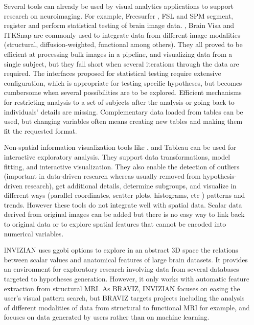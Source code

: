 \documentclass[twocolumn]{svjour3}
\begin{document}
Several tools can already be used by visual analytics applications to support research on neuroimaging. For example, Freesurfer \cite{fischl_freesurfer_2012}, FSL \cite{jenkinson_fsl_2012} and SPM \cite{friston_statistical_2006} segment, register and perform statistical testing of brain image data. \cite{fedorov_3d_2012}, Brain Visa \cite{cointepas_brainvisa:_2001} and ITKSnap \cite{yushkevich_user-guided_2006} are commonly used to integrate data from different image modalities (structural, diffusion-weighted, functional among others). They all proved to be efficient at processing bulk images in a pipeline, and visualizing data from a single subject, but they fall short when several iterations through the data are required. The interfaces proposed for statistical testing require extensive configuration, which is appropriate for testing specific hypotheses, but becomes cumbersome when several possibilities are to be explored. Efficient mechanisms for restricting analysis to a set of subjects after the analysis or going back to individuals’ details are missing. Complementary data loaded from tables can be used, but changing variables often means creating new tables and making them fit the requested format.


Non-spatial information visualization tools like \cite{cook_interactive_2007}, and Tableau\cite{hanrahan_tableau_2003} can be used for interactive exploratory analysis. They support data transformations, model fitting, and interactive visualization. They also enable the detection of outliers (important in data-driven research whereas usually removed from hypothesis-driven research), get additional details, determine subgroups, and visualize in different ways (parallel coordinates, scatter plots, histograms, etc ) patterns and trends. However these tools do not integrate well with spatial data. Scalar data derived from original images can be added but there is no easy way to link back to original data or to explore spatial features that cannot be encoded into numerical variables.


INVIZIAN \cite{bowman_query-based_2011}\cite{bowman_feature-similarity_2012}\cite{bowman_visual_2012} uses ggobi options to explore in an abstract 3D space the relations between scalar values and anatomical features of large brain datasets. It provides an environment for exploratory research involving data from several databases targeted to hypotheses generation. However, it only works with automatic feature extraction from structural MRI. As BRAVIZ, INVIZIAN focuses on easing the user’s visual pattern search, but BRAVIZ targets projects including the analysis of different modalities of data from structural to functional MRI for example, and focuses on data generated by users rather than on machine learning. 
\end{document}
